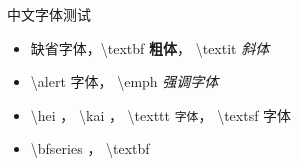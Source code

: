 
\begin{frame}{中文字体测试}
    \begin{itemize} %
        \item 缺省字体，\textbackslash textbf \textbf{粗体}，
            \textbackslash textit \textit{斜体}
        \item \textbackslash alert \alert{字体}，
            \textbackslash emph \emph{强调字体}
        \item \textbackslash hei ，
            \textbackslash kai ，
            \textbackslash texttt \texttt{字体}，
            \textbackslash textsf \textsf{字体}
        \item \textbackslash bfseries {\bfseries {}}，
            \textbackslash textbf \textbf{}
    \end{itemize}
\end{frame}
